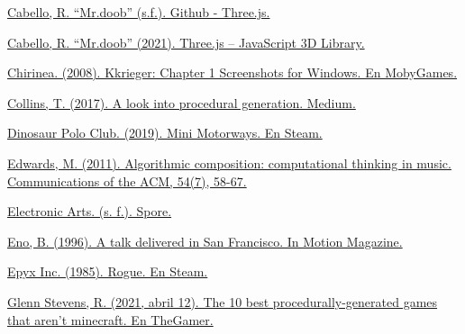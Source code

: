 \begin{thebibliography}{1}
	\href{https://github.com/mrdoob/three.js}{Cabello, R. ``Mr.doob'' (s.f.). Github - Three.js.}
	
	
	\href{https://threejs.org/}{Cabello, R. ``Mr.doob'' (2021). Three.js – JavaScript 3D Library.}
	
	
	\href{https://www.mobygames.com/game/windows/kkrieger-chapter-1/screenshots/gameShotId,280133/}{Chirinea. (2008). Kkrieger: Chapter 1 Screenshots for Windows. En MobyGames.}
	
	
	\href{https://medium.com/@homicidalnacho/a-look-into-procedural-generation-dfa62fe7536d}{Collins, T. (2017). A look into procedural generation. Medium.}
	
	
	
	\href{https://store.steampowered.com/app/1127500/Mini_Motorways/}{Dinosaur Polo Club. (2019). Mini Motorways. En Steam.}
	
	
	
	\href{https://doi.org/10.1145/1965724.1965742}{Edwards, M. (2011). Algorithmic composition: computational thinking in music. Communications of the ACM, 54(7), 58-67.}
	
	
	\href{https://www.ea.com/es-es/games/spore/spore}{Electronic Arts. (s. f.). Spore.}
	
	
	\href{https://inmotionmagazine.com/eno1.html}{Eno, B. (1996). A talk delivered in San Francisco. In Motion Magazine.}
	
	
	\href{https://store.steampowered.com/app/1443430/Rogue/}{Epyx Inc. (1985). Rogue. En Steam.}
	
	
	
	\href{https://www.thegamer.com/best-procedurally-generated-games-minecraft/}{Glenn Stevens, R. (2021, abril 12). The 10 best procedurally-generated games that aren’t minecraft. En TheGamer.}
	

\end{thebibliography}
